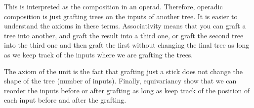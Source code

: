 \documentclass[TFM.tex]{subfiles}
\begin{document}
This is interpreted as the composition in an operad. Therefore, operadic composition is just grafting trees on the inputs of another tree. It is easier to understand the axioms in these terms. Associativity means that you can graft a tree into another, and graft the result into a third one, or graft the second tree into the third one and then graft the first without changing the final tree as long as we keep track of the inputs where we are grafting the trees. 

The axiom of the unit is the fact that grafting just a stick does not change the shape of the tree (number of inputs). Finally, equivariancy show that we can reorder the inputs before or after grafting as long as keep track of the position of each input before and after the grafting.

\end{document}
